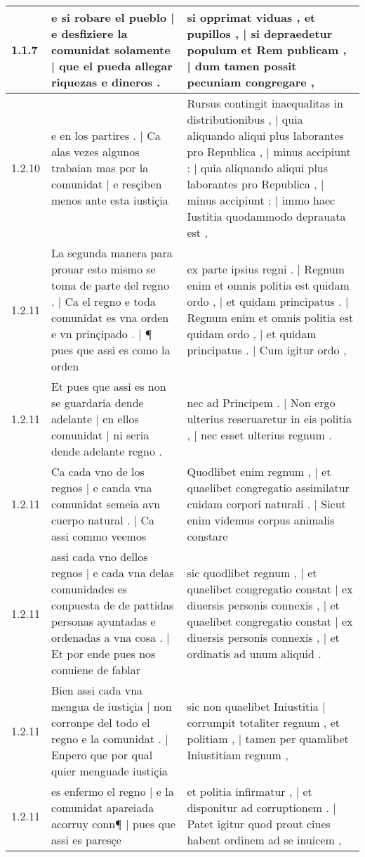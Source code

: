 \begin{tabular}{|p{1cm}|p{6.5cm}|p{6.5cm}|}

\hline
1.1.7 & e si robare el pueblo | e desfiziere la comunidat solamente | que el pueda allegar riquezas e dineros . & si opprimat viduas , et pupillos , | si depraedetur populum et Rem publicam , | dum tamen possit pecuniam congregare , \\\hline
1.2.10 & e en los partires . | Ca alas vezes algunos trabaian mas por la comunidat | e resçiben menos ante esta iustiçia & Rursus contingit inaequalitas in distributionibus , | quia aliquando aliqui plus laborantes pro Republica , | minus accipiunt : | quia aliquando aliqui plus laborantes pro Republica , | minus accipiunt : | immo haec Iustitia quodammodo deprauata est , \\\hline
1.2.11 & La segunda manera para prouar esto mismo se toma de parte del regno . | Ca el regno e toda comunidat es vna orden e vn prinçipado . | ¶ pues que assi es como la orden & ex parte ipsius regni . | Regnum enim et omnis politia est quidam ordo , | et quidam principatus . | Regnum enim et omnis politia est quidam ordo , | et quidam principatus . | Cum igitur ordo , \\\hline
1.2.11 & Et pues que assi es non se guardaria dende adelante | en ellos comunidat | ni seria dende adelante regno . & nec ad Principem . | Non ergo ulterius reseruaretur in eis politia , | nec esset ulterius regnum . \\\hline
1.2.11 & Ca cada vno de los regnos | e canda vna comunidat semeia avn cuerpo natural . | Ca assi commo veemos & Quodlibet enim regnum , | et quaelibet congregatio assimilatur cuidam corpori naturali . | Sicut enim videmus corpus animalis constare \\\hline
1.2.11 & assi cada vno dellos regnos | e cada vna delas comunidades es conpuesta de de pattidas personas ayuntadas e ordenadas a vna cosa . | Et por ende pues nos conuiene de fablar & sic quodlibet regnum , | et quaelibet congregatio constat | ex diuersis personis connexis , | et quaelibet congregatio constat | ex diuersis personis connexis , | et ordinatis ad unum aliquid . \\\hline
1.2.11 & Bien assi cada vna mengua de iustiçia | non corronpe del todo el regno e la comunidat . | Enpero que por qual quier menguade iustiçia & sic non quaelibet Iniustitia | corrumpit totaliter regnum , et politiam , | tamen per quamlibet Iniustitiam regnum , \\\hline
1.2.11 & es enfermo el regno | e la comunidat apareiada acorruy conn¶ | pues que assi es paresçe & et politia infirmatur , | et disponitur ad corruptionem . | Patet igitur quod prout ciues habent ordinem ad se inuicem , \\\hline

\end{tabular}
